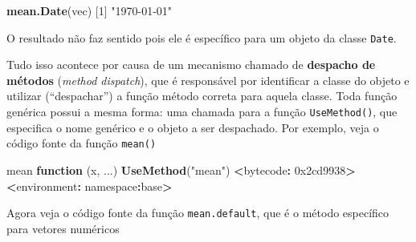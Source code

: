 \documentclass[10pt,a4paper]{book}
\newenvironment{Shaded}{\begin{snugshade}}{\end{snugshade}}
\newcommand{\KeywordTok}[1]{\textcolor[rgb]{0.13,0.29,0.53}{\textbf{#1}}}
\newcommand{\DecValTok}[1]{\textcolor[rgb]{0.00,0.00,0.81}{#1}}
\newcommand{\StringTok}[1]{\textcolor[rgb]{0.31,0.60,0.02}{#1}}
\newcommand{\ControlFlowTok}[1]{\textcolor[rgb]{0.13,0.29,0.53}{\textbf{#1}}}
\newcommand{\OperatorTok}[1]{\textcolor[rgb]{0.81,0.36,0.00}{\textbf{#1}}}
\newcommand{\ErrorTok}[1]{\textcolor[rgb]{0.64,0.00,0.00}{\textbf{#1}}}
\newcommand{\NormalTok}[1]{#1}
\begin{document}
\begin{Shaded}
\begin{Highlighting}[]
\KeywordTok{mean.Date}\NormalTok{(vec)}
\NormalTok{[}\DecValTok{1}\NormalTok{] }\StringTok{"1970-01-01"}
\end{Highlighting}
\end{Shaded}

O resultado não faz sentido pois ele é específico para um objeto da
classe \texttt{Date}.

Tudo isso acontece por causa de um mecanismo chamado de \textbf{despacho
de métodos} (\emph{method dispatch}), que é responsável por identificar
a classe do objeto e utilizar (``despachar'') a função método correta
para aquela classe. Toda função genérica possui a mesma forma: uma
chamada para a função \texttt{UseMethod()}, que especifica o nome
genérico e o objeto a ser despachado. Por exemplo, veja o código fonte
da função \texttt{mean()}

\begin{Shaded}
\begin{Highlighting}[]
\NormalTok{mean}
\ControlFlowTok{function}\NormalTok{ (x, ...) }
\KeywordTok{UseMethod}\NormalTok{(}\StringTok{"mean"}\NormalTok{)}
\OperatorTok{<}\NormalTok{bytecode}\OperatorTok{:}\StringTok{ }\DecValTok{0x2cd9938}\OperatorTok{>}
\ErrorTok{<}\NormalTok{environment}\OperatorTok{:}\StringTok{ }\NormalTok{namespace}\OperatorTok{:}\NormalTok{base}\OperatorTok{>}
\end{Highlighting}
\end{Shaded}

Agora veja o código fonte da função \texttt{mean.default}, que é o
método específico para vetores numéricos
\end{document}
